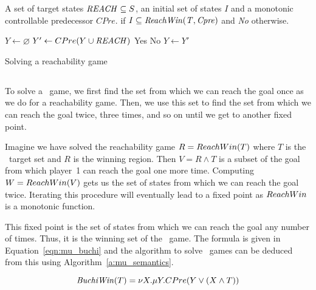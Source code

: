 \begin{algorithm}[t]
\begin{algorithmic}

\Require A set of target states $\mathit{REACH} \subseteq S$, an initial set of states $I$ and a monotonic controllable predecessor $CPre$.
 if $I \subseteq \mathit{ReachWin(T, Cpre)}$ and {\it No} otherwise.

    \State $Y \gets \varnothing$
    \Loop
        \State $Y' \gets CPre(Y \cup \mathit{REACH})$
                \State\Return Yes
            \Else
                \State\Return No
            \EndIf
        \EndIf
        \State $Y \gets Y'$
    \EndLoop
\EndFunction

\end{algorithmic}
\caption{Solving a reachability game}
\label{a:reach}
\end{algorithm}

\subsection{\buchi}

To solve a \buchi\ game, we first find the set from which we can reach the goal once as we do for a reachability game. Then, we use this set to find the set from which we can reach the goal twice, three times, and so on until we get to another fixed point. 

Imagine we have solved the reachability game $R = ReachWin(T)$ where $T$ is the \buchi\ target set and $R$ is the winning region. Then $V = R \wedge T$ is a subset of the goal from which player~1 can reach the goal one more time. Computing $W = ReachWin(V)$ gets us the set of states from which we can reach the goal twice. Iterating this procedure will eventually lead to a fixed point as $ReachWin$ is a monotonic function.

This fixed point is the set of states from which we can reach the goal any number of times. Thus, it is the winning set of the \buchi\ game. The \mucalc formula is given in Equation~\ref{eqn:mu_buchi} and the algorithm to solve \buchi\ games can be deduced from this using Algorithm~\ref{a:mu_semantics}.

\begin{equation}
    \mathit{BuchiWin}(T) = \nu X. \mu Y. CPre(Y \vee (X \wedge T))
\label{eqn:mu_buchi}
\end{equation}


